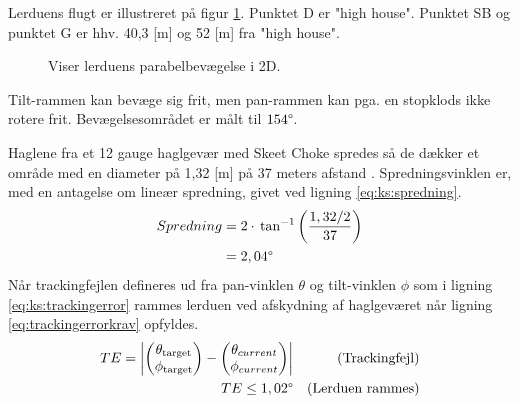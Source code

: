 Lerduens flugt er illustreret på figur \ref{fig:para_total}.
Punktet D er "high house".
Punktet SB og punktet G er hhv. 40,3 [m] og 52 [m] fra "high house". \\
\begin{figure}[h!]
\centering
{}
\caption[Lerduens parabel i 2D]{Viser lerduens parabelbevægelse i 2D.}
\label{fig:para_total}
\end{figure}

Tilt-rammen kan bevæge sig frit,
men pan-rammen kan pga. en stopklods ikke rotere frit.
Bevægelsesområdet er målt til \(154\degree\).

Haglene fra et 12 gauge haglgevær med Skeet Choke spredes så de dækker et område
med en diameter på 1,32 [m] på 37 meters afstand
\citep[Pattern and choke]{patternandchoke}.
Spredningsvinklen er, med en antagelse om lineær spredning, givet ved ligning \ref{eq:ks:spredning}.
\begin{align}
\begin{split}
  Spredning &= 2\cdot{}\tan^{-1}\left(\frac{1,32/2}{37}\right) \\
  &= 2,04\degree
  \end{split}
  \label{eq:ks:spredning}
\end{align}
Når trackingfejlen defineres ud fra pan-vinklen \(\theta\) og tilt-vinklen \(\phi\) som i ligning \ref{eq:ks:trackingerror} rammes 
lerduen ved afskydning af haglgeværet når ligning \ref{eq:trackingerrorkrav} opfyldes.
\begin{align}
  TE = \left | \begin{pmatrix}  \theta_{\text{target}}\\ \phi_{\text{target}}\end{pmatrix} - \begin{pmatrix} \theta_{current}\\ 
  \phi_{current}\end{pmatrix} \right | &&\text{(Trackingfejl)}
\label{eq:ks:trackingerror}
\\
	TE\leq 1,02\degree && \text{(Lerduen rammes)}
\label{eq:trackingerrorkrav}
\end{align}

